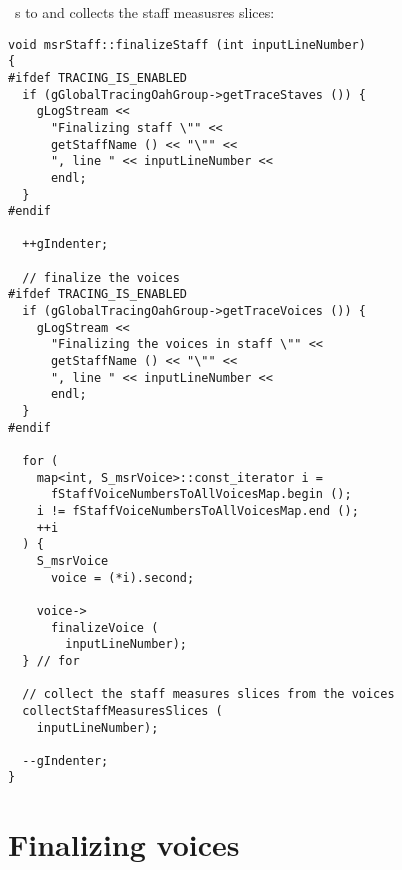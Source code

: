  \cascade\ s to  and collects the staff measusres slices:
\begin{lstlisting}[language=CPlusPlus]
void msrStaff::finalizeStaff (int inputLineNumber)
{
#ifdef TRACING_IS_ENABLED
  if (gGlobalTracingOahGroup->getTraceStaves ()) {
    gLogStream <<
      "Finalizing staff \"" <<
      getStaffName () << "\"" <<
      ", line " << inputLineNumber <<
      endl;
  }
#endif

  ++gIndenter;

  // finalize the voices
#ifdef TRACING_IS_ENABLED
  if (gGlobalTracingOahGroup->getTraceVoices ()) {
    gLogStream <<
      "Finalizing the voices in staff \"" <<
      getStaffName () << "\"" <<
      ", line " << inputLineNumber <<
      endl;
  }
#endif

  for (
    map<int, S_msrVoice>::const_iterator i =
      fStaffVoiceNumbersToAllVoicesMap.begin ();
    i != fStaffVoiceNumbersToAllVoicesMap.end ();
    ++i
  ) {
    S_msrVoice
      voice = (*i).second;

    voice->
      finalizeVoice (
        inputLineNumber);
  } // for

  // collect the staff measures slices from the voices
  collectStaffMeasuresSlices (
    inputLineNumber);

  --gIndenter;
}
\end{lstlisting}


\section{Finalizing voices}

